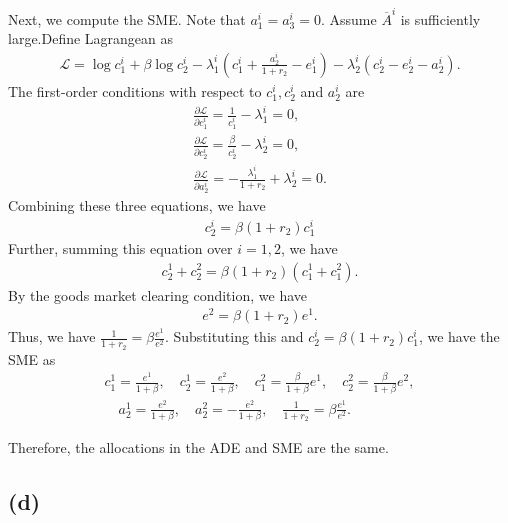\documentclass[a4paper]{article}
\begin{document}
Next, we compute the SME. Note that $a_1^i = a_3^i = 0$. Assume $\overline{A}^i$ is sufficiently large.Define Lagrangean as 
\begin{gather*}
    \mathcal{L} = \log c_1^i + \beta \log c_2^i - \lambda_1^i \left( c_1^i + \frac{a_{2}^i}{1 + r_2} - e_1^i \right) - \lambda_2^i \left( c_2^i - e_2^i - a_2^i \right).
\end{gather*}
The first-order conditions with respect to $c_1^i, c_2^i$ and $a_2^i$ are
\begin{gather*}
    \frac{\partial \mathcal{L}}{\partial c_1^i} = \frac{1}{c_1^i} - \lambda_1^i = 0, \\
    \frac{\partial \mathcal{L}}{\partial c_2^i} = \frac{\beta}{c_2^i} - \lambda_2^i = 0, \\
    \frac{\partial \mathcal{L}}{\partial a_2^i} = -\frac{\lambda_1^i}{1 + r_2} + \lambda_2^i = 0.
\end{gather*}
Combining these three equations, we have
\begin{gather*}
    c_2^i = \beta (1 + r_2) c_1^i 
\end{gather*}
Further, summing this equation over $i=1,2$, we have
\begin{gather*}
    c_2^1 + c_2^2 = \beta (1 + r_2) (c_1^1 + c_1^2).
\end{gather*}
By the goods market clearing condition, we have
\begin{gather*}
    e^2 = \beta (1 + r_2) e^1.
\end{gather*}
Thus, we have $\frac{1}{1+r_2} = \beta \frac{e^1}{e^2}$. 
Substituting this and $c_2^i = \beta (1 + r_2) c_1^i$, we have the SME as 
\begin{gather*}
    c_1^1 = \frac{e^1}{1 + \beta}, \quad c_2^1 = \frac{e^2}{1 + \beta }, \quad c_1^2 = \frac{\beta}{1 + \beta}e^1, \quad c_2^2 = \frac{\beta}{1 + \beta }e^2,\\
     \quad a_2^1 = \frac{e^2}{1 + \beta }, \quad a_2^2 = -\frac{e^2}{1 + \beta },
    \quad \frac{1}{1+r_2} = \beta \frac{e^1}{e^2}.
\end{gather*}

Therefore, the allocations in the ADE and SME are the same.

\subsection*{(d)}
\end{document}
